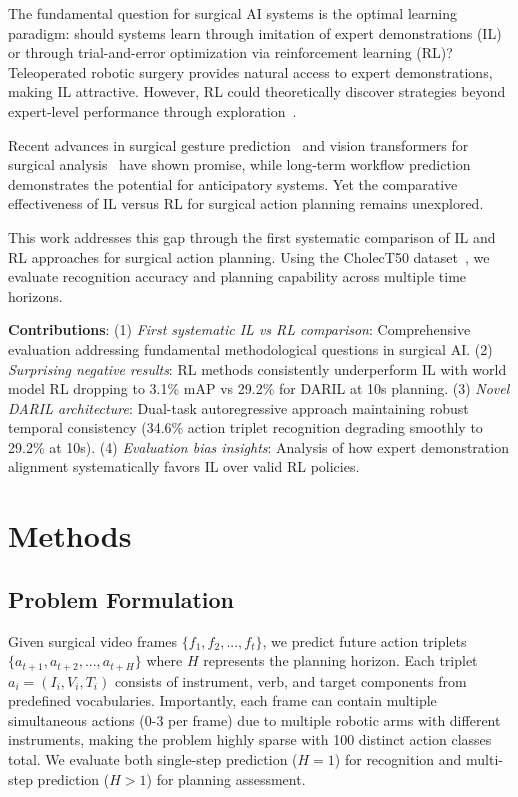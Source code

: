 \documentclass[runningheads]{llncs}
\begin{document}
The fundamental question for surgical AI systems is the optimal learning paradigm: should systems learn through imitation of expert demonstrations (IL) or through trial-and-error optimization via reinforcement learning (RL)? Teleoperated robotic surgery provides natural access to expert demonstrations, making IL attractive. However, RL could theoretically discover strategies beyond expert-level performance through exploration~\cite{liu2024surgical}.

Recent advances in surgical gesture prediction~\cite{shi2022recognition,weerasinghe2024multimodal} and vision transformers for surgical analysis~\cite{wagner2023vision,liu2023skit} have shown promise, while long-term workflow prediction~\cite{boels2025swag} demonstrates the potential for anticipatory systems. Yet the comparative effectiveness of IL versus RL for surgical action planning remains unexplored.

This work addresses this gap through the first systematic comparison of IL and RL approaches for surgical action planning. Using the CholecT50 dataset~\cite{nwoye2022cholect50}, we evaluate recognition accuracy and planning capability across multiple time horizons.

\textbf{Contributions}: (1) \textit{First systematic IL vs RL comparison}: Comprehensive evaluation addressing fundamental methodological questions in surgical AI. (2) \textit{Surprising negative results}: RL methods consistently underperform IL with world model RL dropping to 3.1\% mAP vs 29.2\% for DARIL at 10s planning. (3) \textit{Novel DARIL architecture}: Dual-task autoregressive approach maintaining robust temporal consistency (34.6\% action triplet recognition degrading smoothly to 29.2\% at 10s). (4) \textit{Evaluation bias insights}: Analysis of how expert demonstration alignment systematically favors IL over valid RL policies.

\section{Methods}

\subsection{Problem Formulation}

Given surgical video frames $\{f_1, f_2, ..., f_t\}$, we predict future action triplets $\{a_{t+1}, a_{t+2}, ..., a_{t+H}\}$ where $H$ represents the planning horizon. Each triplet $a_i = (I_i, V_i, T_i)$ consists of instrument, verb, and target components from predefined vocabularies. Importantly, each frame can contain multiple simultaneous actions (0-3 per frame) due to multiple robotic arms with different instruments, making the problem highly sparse with 100 distinct action classes total. We evaluate both single-step prediction ($H=1$) for recognition and multi-step prediction ($H>1$) for planning assessment.
\end{document}
